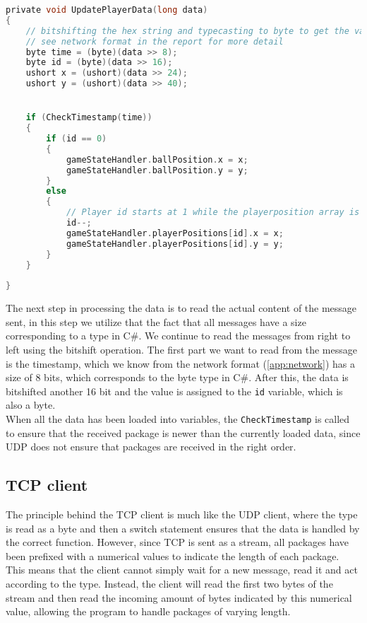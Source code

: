 \begin{lstlisting}[caption={Updating player data in UDP client}, captionpos=b,language=C,label={lst:updateplayerdata}]
private void UpdatePlayerData(long data)
{
    // bitshifting the hex string and typecasting to byte to get the values.
    // see network format in the report for more detail
    byte time = (byte)(data >> 8);
    byte id = (byte)(data >> 16);
    ushort x = (ushort)(data >> 24);
    ushort y = (ushort)(data >> 40);


    if (CheckTimestamp(time))
    {
        if (id == 0)
        {
            gameStateHandler.ballPosition.x = x;
            gameStateHandler.ballPosition.y = y;
        }
        else
        {
            // Player id starts at 1 while the playerposition array is 0 indexed. Decrementing id so that they line up.
            id--;
            gameStateHandler.playerPositions[id].x = x;
            gameStateHandler.playerPositions[id].y = y;
        }
    }
    
}
\end{lstlisting}

The next step in processing the data is to read the actual content of the message sent, in this step we utilize that the fact that all messages have a size corresponding to a type in C\#.
We continue to read the messages from right to left using the bitshift operation.
The first part we want to read from the message is the timestamp, which we know from the network format (\autoref{app:network}) has a size of 8 bits, which corresponds to the byte type in C\#.
After this, the data is bitshifted another 16 bit and the value is assigned to the \texttt{id} variable, which is also a byte.\\
When all the data has been loaded into variables, the \texttt{CheckTimestamp} is called to ensure that the received package is newer than the currently loaded data, since UDP does not ensure that packages are received in the right order.

\subsection*{TCP client}
The principle behind the TCP client is much like the UDP client, where the type is read as a byte and then a switch statement ensures that the data is handled by the correct function.
However, since TCP is sent as a stream, all packages have been prefixed with a numerical values to indicate the length of each package.
This means that the client cannot simply wait for a new message, read it and act according to the type.
Instead, the client will read the first two bytes of the stream and then read the incoming amount of bytes indicated by this numerical value, allowing the program to handle packages of varying length.
